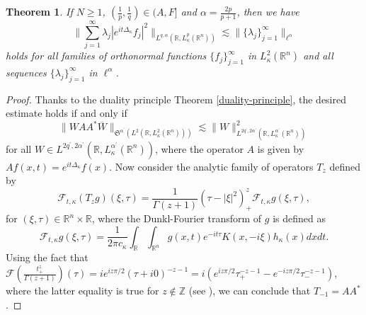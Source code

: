 \documentclass[a4paper,11pt, reqno]{amsart}
\numberwithin{equation}{section}
\theoremstyle{plain}
\newtheorem{theorem}{Theorem}[section]
\theoremstyle{definition}
\theoremstyle{remark}
\begin{document}
\begin{theorem} \label{Lorentz-refined}
If $N\geq 1$, $(\frac{1}{p},\frac{1}{q})\in (A,F]$ and $\alpha=\frac{2p}{p+1}$, then we have
\begin{equation*}
			\bigg\|\sum_{j=1}^\infty \lambda_j|e^{it\Delta_\kappa}f_j|^2\bigg\|_{L^{q,\alpha}(\mathbb{R}, L_\kappa^p(\mathbb{R}^n))}\lesssim \|\{\lambda_j\}^\infty_{j=1}\|_{\ell^{\alpha}} 
\end{equation*}	
  holds for all families of orthonormal functions $\{f_j\}_{j=1}^\infty$ in $L_\kappa^2(\mathbb{R}^n)$ and all sequences $\{\lambda_j\}^\infty_{j=1}$ in $\ell^{\alpha}$. 
\end{theorem}
\begin{proof}Thanks to the duality principle Theorem \ref{duality-principle}, the desired estimate holds if and only if
\begin{equation}\label{T_1}
	\big\|WAA^*\overline{W}\big\|_{\mathfrak{S}^{\alpha^\prime}(L^2(\mathbb{R}, L_\kappa^2(\mathbb{R}^n)))}\lesssim \big\|W\big\|^2_{L^{2q^\prime,2\alpha^\prime}(\mathbb{R}, L_\kappa^{\alpha^\prime}(\mathbb{R}^n))}
		\end{equation}
  for all $W\in L^{2q^\prime,2\alpha^\prime}(\mathbb{R}, L_\kappa^{\alpha^\prime}(\mathbb{R}^n))$, where the operator $A$ is given by  $Af(x,t)=e^{it\Delta_\kappa}f(x)$.
 Now consider the analytic family of operators $T_z$ defined by
\begin{equation*}
    \mathcal{F}_{t,\kappa}(T_zg)(\xi,\tau)=\frac{1}{\Gamma(z+1)}(\tau-|\xi|^2)_+^z\mathcal{F}_{t,\kappa}g(\xi,\tau),
\end{equation*}
for $(\xi,\tau)\in\mathbb{R}^n\times\mathbb{R}$, where the Dunkl-Fourier transform of $g$ is defined as
\begin{equation*}
    \mathcal{F}_{t,\kappa}g(\xi,\tau)=\frac{1}{2\pi c_\kappa}\int_{\mathbb{R}}\int_{\mathbb{R}^{n}} g(x,t) e^{-it\tau}K(x,-i\xi)h_\kappa(x)dxdt.
\end{equation*}
Using the fact that $\mathcal{F}\left(\frac{t_+^z}{\Gamma(z+1)}\right)(\tau)=ie^{iz \pi/2}(\tau+i0)^{-z-1}=i\left(e^{iz \pi/2}\tau_+^{-z-1}-e^{-iz \pi/2}\tau^{-z-1}_-\right)$, where the latter equality is true for $z\not\in\mathbb{Z}$ (see \cite{Gelfand-Shilov}), we can conclude that
$T_{-1}=AA^*$.


\end{proof}
\end{document}
